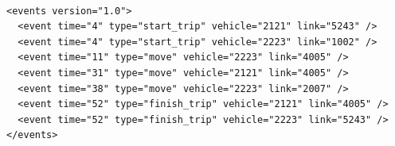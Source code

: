 \begin{lstlisting}[style=myxml, caption={Exemplo de arquivo de saída output.xml com os eventos da simulação.}, label=output.xml]

<events version="1.0">
  <event time="4" type="start_trip" vehicle="2121" link="5243" />
  <event time="4" type="start_trip" vehicle="2223" link="1002" />
  <event time="11" type="move" vehicle="2223" link="4005" />
  <event time="31" type="move" vehicle="2121" link="4005" />
  <event time="38" type="move" vehicle="2223" link="2007" />
  <event time="52" type="finish_trip" vehicle="2121" link="4005" />
  <event time="52" type="finish_trip" vehicle="2223" link="5243" />
</events>
\end{lstlisting}
